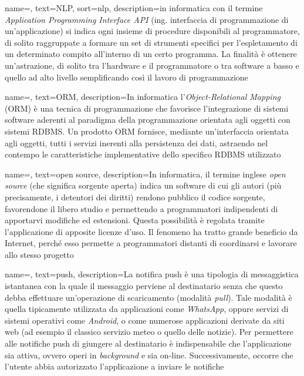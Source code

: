 {
    name=,
    text=NLP,
    sort=nlp,
    description={in informatica con il termine \emph{Application Programming Interface API} (ing. interfaccia di programmazione di un'applicazione) si indica ogni insieme di procedure disponibili al programmatore, di solito raggruppate a formare un set di strumenti specifici per l'espletamento di un determinato compito all'interno di un certo programma. La finalità è ottenere un'astrazione, di solito tra l'hardware e il programmatore o tra software a basso e quello ad alto livello semplificando così il lavoro di programmazione}
}

{
    name=,
    text=ORM,
    description={In informatica l'\emph{Object-Relational Mapping} (ORM) è una tecnica di programmazione che favorisce l'integrazione di sistemi software aderenti al paradigma della programmazione orientata agli oggetti con sistemi RDBMS.
Un prodotto ORM fornisce, mediante un'interfaccia orientata agli oggetti, tutti i servizi inerenti alla persistenza dei dati, astraendo nel contempo le caratteristiche implementative dello specifico RDBMS utilizzato}
}

{
    name=,
    text=open source,
    description={In informatica, il termine inglese \emph{open source} (che significa sorgente aperta) indica un software di cui gli autori (più precisamente, i detentori dei diritti) rendono pubblico il codice sorgente, favorendone il libero studio e permettendo a programmatori indipendenti di apportarvi modifiche ed estensioni. Questa possibilità è regolata tramite l'applicazione di apposite licenze d'uso. Il fenomeno ha tratto grande beneficio da Internet, perché esso permette a programmatori distanti di coordinarsi e lavorare allo stesso progetto}
}

{
    name=,
    text=push,
    description={La notifica push è una tipologia di messaggistica istantanea con la quale il messaggio perviene al destinatario senza che questo debba effettuare un'operazione di scaricamento (modalità \emph{pull}). Tale modalità è quella tipicamente utilizzata da applicazioni come \emph{WhatsApp}, oppure servizi di sistemi operativi come \emph{Android}, o come numerose applicazioni derivate da siti web (ad esempio il classico servizio meteo o quello delle notizie).
Per permettere alle notifiche push di giungere al destinatario è indispensabile che l'applicazione sia attiva, ovvero operi in \emph{background} e sia on-line. Successivamente, occorre che l'utente abbia autorizzato l'applicazione a inviare le notifiche}
}

